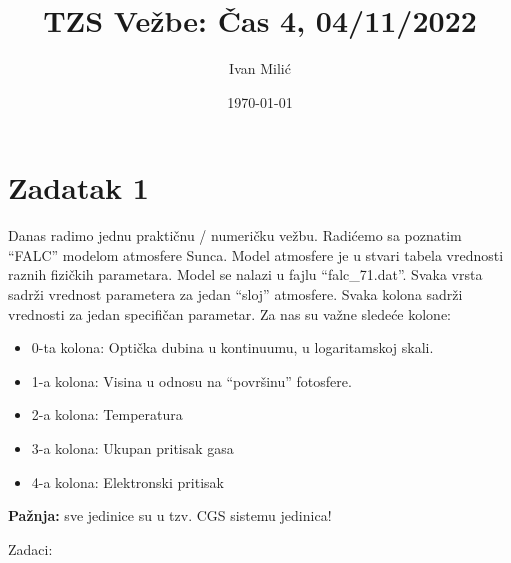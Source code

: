 \documentclass[12pt]{article}
\title{TZS Ve\v{z}be: \v{C}as 4, 04/11/2022}
\author{Ivan Mili\'{c}}
\date{\today}
\begin{document}
\maketitle

\section*{Zadatak 1}

Danas radimo jednu prakti\v{c}nu / numeri\v{c}ku ve\v{z}bu. Radi\'{c}emo sa poznatim ``FALC'' modelom atmosfere Sunca. Model atmosfere je u stvari tabela vrednosti raznih fizi\v{c}kih parametara. Model se nalazi u fajlu ``falc_71.dat''. Svaka vrsta sadr\v{z}i vrednost parametera za jedan ``sloj'' atmosfere. Svaka kolona sadr\v{z}i vrednosti za jedan specifi\v{c}an parametar. Za nas su va\v{z}ne slede\'{c}e kolone:
\begin{itemize}
    \item 0-ta kolona: Opti\v{c}ka dubina u kontinuumu, u logaritamskoj skali.
    \item 1-a kolona: Visina u odnosu na ``povr\v{s}inu'' fotosfere.
    \item 2-a kolona: Temperatura
    \item 3-a kolona: Ukupan pritisak gasa
    \item 4-a kolona: Elektronski pritisak
\end{itemize}

\textbf{Pa\v{z}nja:} sve jedinice su u tzv. CGS sistemu jedinica!

Zadaci: 
\end{document}

